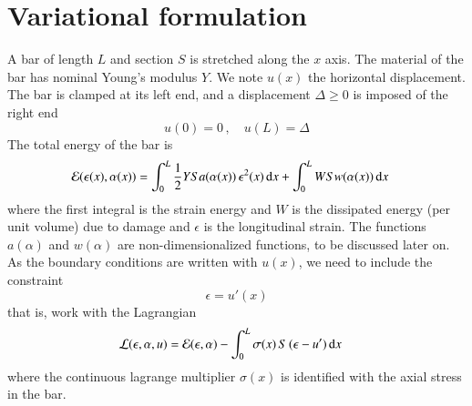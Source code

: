 \documentclass[final,3p,times,authoryear]{elsarticle}
\renewcommand*\d{\mathop{}\!\mathrm{d}} %
\begin{document}

%
%
%
%
%
%
\section{Variational formulation} \label{sec:varia}
%
%
%
%
%
%
%
A bar of length $L$ and section $S$ is stretched along the $x$ axis.
The material of the bar has nominal Young's modulus $Y$.
We note $u(x)$ the horizontal displacement.
The bar is clamped at its left end, and a displacement $\Delta \ge 0$ is imposed of the right end
\begin{equation}
\label{eq:bc}
u(0)=0 \, , \quad u(L)=\Delta
\end{equation}
 The total energy of the bar is
\begin{align}
\label{eq:energy}
{\cal E}(\epsilon(x),\alpha(x)) & = \int_0^L \frac12 Y S a(\alpha(x)) \, \epsilon^2(x) \d x+ \int_0^L W S w(\alpha(x)) \d x
\end{align}
where the first integral is the strain energy and $W$ is the dissipated energy (per unit volume) due to damage and $\epsilon$ is the longitudinal strain.
The functions  $a(\alpha)$ and $w(\alpha)$ are non-dimensionalized functions, to be discussed later on.
As the boundary conditions are written with $u(x)$, we need to include the constraint
\begin{equation}
\label{eq:strain_disp}
\epsilon = u'(x)
\end{equation}
that is, work with the Lagrangian
\begin{align}
\label{eq:lagrangian}
{\cal L}(\epsilon,\alpha,u) & = {\cal E}(\epsilon,\alpha) -  \int_0^L \sigma(x) \, S \,  (\epsilon-u') \d x
\end{align}
where the continuous lagrange multiplier $\sigma(x)$ is identified with the axial stress in the bar.


%
%
%
%
%
%
%
\end{document}
